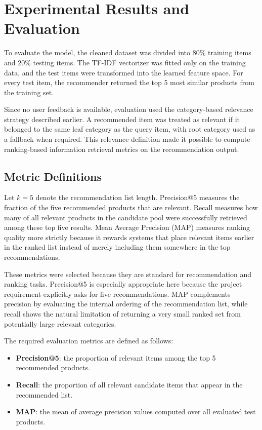 \documentclass[conference]{IEEEtran}
\begin{document}
\section{Experimental Results and Evaluation}
To evaluate the model, the cleaned dataset was divided into 80\% training items and 20\% testing items. The TF-IDF vectorizer was fitted only on the training data, and the test items were transformed into the learned feature space. For every test item, the recommender returned the top 5 most similar products from the training set.

Since no user feedback is available, evaluation used the category-based relevance strategy described earlier. A recommended item was treated as relevant if it belonged to the same leaf category as the query item, with root category used as a fallback when required. This relevance definition made it possible to compute ranking-based information retrieval metrics on the recommendation output.

\subsection{Metric Definitions}
Let $k=5$ denote the recommendation list length. Precision@5 measures the fraction of the five recommended products that are relevant. Recall measures how many of all relevant products in the candidate pool were successfully retrieved among these top five results. Mean Average Precision (MAP) measures ranking quality more strictly because it rewards systems that place relevant items earlier in the ranked list instead of merely including them somewhere in the top recommendations.

These metrics were selected because they are standard for recommendation and ranking tasks. Precision@5 is especially appropriate here because the project requirement explicitly asks for five recommendations. MAP complements precision by evaluating the internal ordering of the recommendation list, while recall shows the natural limitation of returning a very small ranked set from potentially large relevant categories.

The required evaluation metrics are defined as follows:
\begin{itemize}
\item \textbf{Precision@5}: the proportion of relevant items among the top 5 recommended products.
\item \textbf{Recall}: the proportion of all relevant candidate items that appear in the recommended list.
\item \textbf{MAP}: the mean of average precision values computed over all evaluated test products.
\end{itemize}
\end{document}
